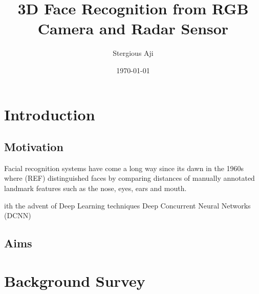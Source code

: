 \documentclass{interim}
\begin{document}
\title{3D Face Recognition from RGB Camera and Radar Sensor}
\author{Stergious Aji}
\date{\today}
\maketitle

\tableofcontents
\newpage

\section{Introduction}\label{intro}

\subsection{Motivation}
Facial recognition systems have come a long way since its dawn in the 1960s where (REF) distinguished faces by comparing distances of manually annotated landmark features such as the nose, eyes, ears and mouth.

ith the advent of Deep Learning techniques Deep Concurrent Neural Networks (DCNN)

\subsection{Aims}



\section{Background Survey}
\end{document}

